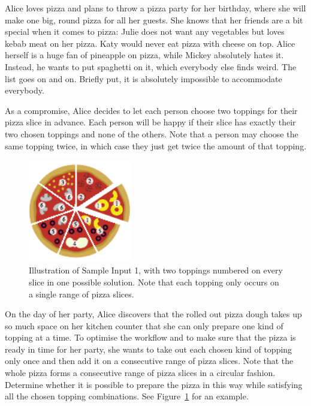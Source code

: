 
Alice loves pizza and plans to throw a pizza party for her birthday, where she will make one big, round pizza for all her guests.
She knows that her friends are a bit special when it comes to pizza:
Julie does not want any vegetables but loves kebab meat on her pizza.
Katy would never eat pizza with cheese on top.
Alice herself is a huge fan of pineapple on pizza, while Mickey absolutely hates it.
Instead, he wants to put spaghetti on it, which everybody else finds weird.
The list goes on and on.
Briefly put, it is absolutely impossible to accommodate everybody.

As a compromise, Alice decides to let each person choose two toppings for their pizza slice in advance.
Each person will be happy if their slice has exactly their two chosen toppings and none of the others.
Note that a person may choose the same topping twice, in which case they just get twice the amount of that topping.

\begin{figure}[!h]
	\centering
	\includegraphics[width=0.4\textwidth]{sample.pdf}
	\caption{Illustration of Sample Input 1, with two toppings numbered on
	every slice in one possible solution. Note that each topping only occurs
	on a single range of pizza slices.}
    \label{fig:k}
\end{figure}

On the day of her party, Alice discovers that the rolled out pizza dough takes up so much space on her kitchen counter that she can only prepare one kind of topping at a time.
To optimise the workflow and to make sure that the pizza is ready in time for
her party, she wants to take out each chosen kind of topping only once and then add it
on a consecutive range of pizza slices.
Note that the whole pizza forms a consecutive range of pizza slices in a circular fashion.
Determine whether it is possible to prepare the pizza in this way while satisfying all the chosen topping combinations.
See Figure~\ref{fig:k} for an example.

